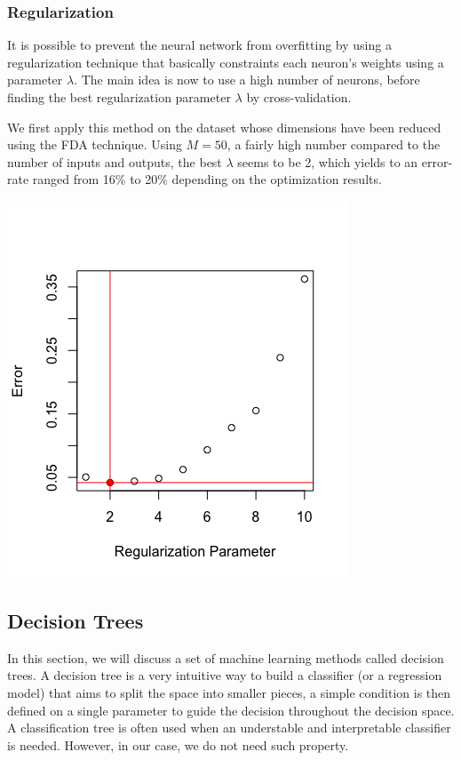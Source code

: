 \documentclass[]{report}
\begin{document}
\subsubsection{Regularization}
 It is possible to prevent the neural network from overfitting by using a regularization technique that basically constraints each neuron's weights using a parameter $\lambda$. The main idea is now to use a high number of neurons, before finding the best regularization parameter  $\lambda$ by cross-validation.
 
 We first apply this method on the dataset whose dimensions have been reduced using the FDA technique. Using $M = 50$, a fairly high number compared to the number of inputs and outputs, the best $\lambda$ seems to be 2, which yields to an error-rate ranged from 16\% to 20\% depending on the optimization results.
 
 \begin{center}
 	\includegraphics[width=0.6\linewidth]{Figures/nnet_fda_reg_cv.png}
 	\label{fig:nnet_fda_reg_cv}
 \end{center}
\pagebreak

\subsection{Decision Trees}
 In this section, we will discuss a set of machine learning methods called decision trees. A decision tree is a very intuitive way to build a classifier (or a regression model) that aims to split the space into smaller pieces, a simple condition is then defined on a single parameter to guide the decision throughout the decision space. A classification tree is often used when an understable and interpretable classifier is needed. However, in our case, we do not need such property.
 
\end{document}
